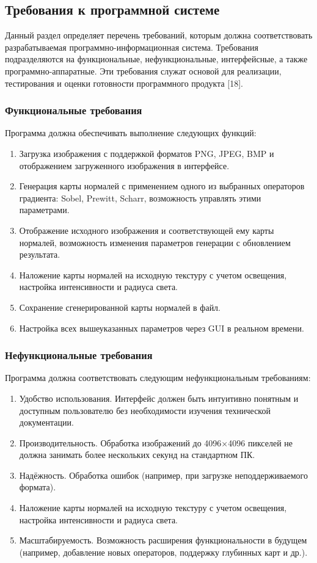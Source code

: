 \subsection{Требования к программной системе}

Данный раздел определяет перечень требований, которым должна соответствовать разрабатываемая программно-информационная система. Требования подразделяются на функциональные, нефункциональные, интерфейсные, а также программно-аппаратные. Эти требования служат основой для реализации, тестирования и оценки готовности программного продукта [18].
\subsubsection{Функциональные требования}

Программа должна обеспечивать выполнение следующих функций:
\begin{enumerate}
	\item Загрузка изображения с поддержкой форматов PNG, JPEG, BMP и отображением загруженного изображения в интерфейсе.
	\item Генерация карты нормалей с применением одного из выбранных операторов градиента: Sobel, Prewitt, Scharr, возможность управлять этими параметрами.
	\item Отображение исходного изображения и соответствующей ему карты нормалей, возможность изменения параметров генерации с обновлением результата.
	\item Наложение карты нормалей на исходную текстуру с учетом освещения, настройка интенсивности и радиуса света.
	\item Сохранение сгенерированной карты нормалей в файл.
	\item Настройка всех вышеуказанных параметров через GUI в реальном времени.
\end{enumerate}
\subsubsection{Нефункциональные требования}

Программа должна соответствовать следующим нефункциональным требованиям:
\begin{enumerate}
	\item Удобство использования. Интерфейс должен быть интуитивно понятным и доступным пользователю без необходимости изучения технической документации.
	\item Производительность. Обработка изображений до 4096×4096 пикселей не должна занимать более нескольких секунд на стандартном ПК.
	\item Надёжность. Обработка ошибок (например, при загрузке неподдерживаемого формата).
	\item Наложение карты нормалей на исходную текстуру с учетом освещения, настройка интенсивности и радиуса света.
	\item Масштабируемость. Возможность расширения функциональности в будущем (например, добавление новых операторов, поддержку глубинных карт и др.).
\end{enumerate}
